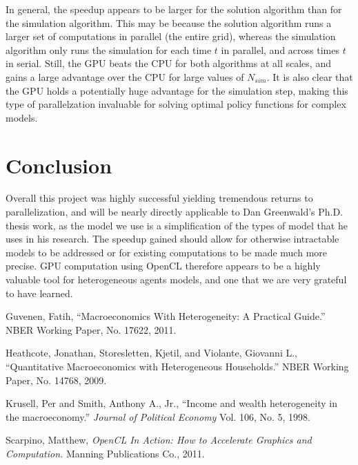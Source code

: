 \documentclass[a4paper,12pt]{article}
\numberwithin{equation}{section}
\theoremstyle{definition}
\begin{document}
In general, the speedup appears to be larger for the solution
algorithm than for the simulation algorithm. This may be because the
solution algorithm runs a larger set of computations in parallel (the
entire grid), whereas the simulation algorithm only runs the
simulation for each time $t$ in parallel, and across times $t$ in
serial. Still, the GPU beats the CPU for both algorithms at all
scales, and gains a large advantage over the CPU for large values of
$N_{sim}$. It is also clear that the GPU holds a potentially huge
advantage for the simulation step, making this type of parallelzation
invaluable for solving optimal policy functions for complex models.

\section{Conclusion}
\label{sec:conclusion}

Overall this project was highly successful yielding tremendous returns
to parallelization, and will be nearly directly applicable to Dan
Greenwald's Ph.D. thesis work, as the model we use is a simplification
of the types of model that he uses in his research. The speedup gained
should allow for otherwise intractable models to be addressed or for
existing computations to be made much more precise. GPU computation
using OpenCL therefore appears to be a highly valuable tool for
heterogeneous agents models, and one that we are very grateful to have
learned.

\clearpage

\begin{thebibliography}{9}

  Guvenen, Fatih,
  ``Macroeconomics With Heterogeneity: A Practical Guide.''
  NBER Working Paper, No. 17622, 2011.

  Heathcote, Jonathan, Storesletten, Kjetil, and Violante, Giovanni L.,
  ``Quantitative Macroeconomics with Heterogeneous Households.''
  NBER Working Paper, No. 14768, 2009.

  Krusell, Per and Smith, Anthony A., Jr.,
  ``Income and wealth heterogeneity in the macroeconomy.''
  \emph{Journal of Political Economy} Vol. 106, No. 5, 1998.

  Scarpino, Matthew,
  \emph{OpenCL In Action: How to Accelerate Graphics and Computation.}
  Manning Publications Co., 2011.

\end{thebibliography}
\end{document}
